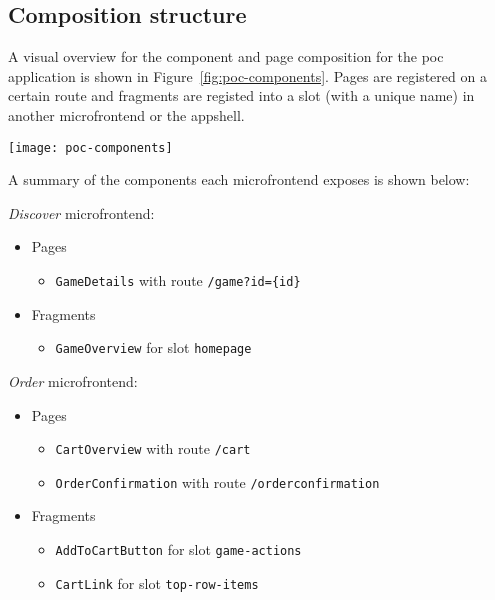 \subsection{Composition structure}
\label{ssec:poc-composition}

A visual overview for the component and page composition for the \gls{poc}
application is shown in Figure~\ref{fig:poc-components}. Pages are registered on
a certain route and fragments are registed into a slot (with a unique name) in
another \gls{microfrontend} or the \gls{appshell}.

\begin{sidewaysfigure}
  \centering
  \texttt{[image: poc-components]}
  \caption[Visual overview for proof-of-concept solution]{A visual overview for
  the component and page composition for the \gls{poc} application. The colored
  dashed lines indicate the sources of the components (blue for
  \textit{``Order''} \gls{microfrontend}, orange for \textit{``Discover''}).}
  \label{fig:poc-components}
\end{sidewaysfigure}

\begin{keeptogether}
  A summary of the components each \gls{microfrontend} exposes is shown below:
  \begin{framed}
    \textit{Discover}  \gls{microfrontend}:
      \begin{itemize}
        \item[] Pages
        \begin{itemize}
          \item \texttt{GameDetails} with route \texttt{/game?id=\{id\}}
        \end{itemize}
        \item[] Fragments
        \begin{itemize}
          \item \texttt{GameOverview} for slot \texttt{homepage}
        \end{itemize}
      \end{itemize}
    \textit{Order} \gls{microfrontend}:
      \begin{itemize}
        \item[] Pages
        \begin{itemize}
          \item \texttt{CartOverview} with route \texttt{/cart}
          \item \texttt{OrderConfirmation} with route \texttt{/orderconfirmation}
        \end{itemize}
        \item[] Fragments
        \begin{itemize}
          \item \texttt{AddToCartButton} for slot \texttt{game-actions}
          \item \texttt{CartLink} for slot \texttt{top-row-items}
        \end{itemize}
      \end{itemize}
  \end{framed} 
\end{keeptogether}


